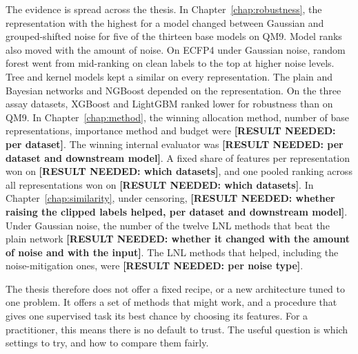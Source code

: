 The evidence is spread across the thesis. In Chapter~\ref{chap:robustness}, the representation with the highest \aucnorm{} for a model changed between Gaussian and grouped-shifted noise for five of the thirteen base models on QM9. Model ranks also moved with the amount of noise. On ECFP4 under Gaussian noise, random forest went from mid-ranking on clean labels to the top at higher noise levels. Tree and kernel models kept a similar \aucnorm{} on every representation. The plain and Bayesian networks and NGBoost depended on the representation. On the three assay datasets, XGBoost and LightGBM ranked lower for robustness than on QM9. In Chapter~\ref{chap:method}, the winning allocation method, number of base representations, importance method and budget were \textbf{[RESULT NEEDED: per dataset]}. The winning internal evaluator was \textbf{[RESULT NEEDED: per dataset and downstream model]}. A fixed share of features per representation won on \textbf{[RESULT NEEDED: which datasets]}, and one pooled ranking across all representations won on \textbf{[RESULT NEEDED: which datasets]}. In Chapter~\ref{chap:similarity}, under censoring, \textbf{[RESULT NEEDED: whether raising the clipped labels helped, per dataset and downstream model]}. Under Gaussian noise, the number of the twelve LNL methods that beat the plain network \textbf{[RESULT NEEDED: whether it changed with the amount of noise and with the input]}. The LNL methods that helped, including the noise-mitigation ones, were \textbf{[RESULT NEEDED: per noise type]}.

The thesis therefore does not offer a fixed recipe, or a new architecture tuned to one problem. It offers a set of methods that might work, and a procedure that gives one supervised task its best chance by choosing its features. For a practitioner, this means there is no default to trust. The useful question is which settings to try, and how to compare them fairly.

